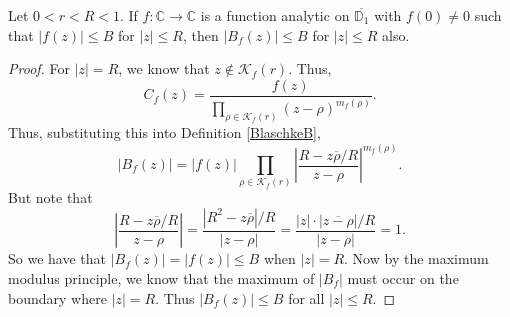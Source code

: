 \begin{lemma}[DiskBound]
\label{DiskBound}
\leanok
Let $0 < r < R<1$. If $f:\mathbb{C}\to\mathbb{C}$ is a function analytic on
    $\overline{\mathbb{D}_1}$ with $f(0)\neq0$ such that $|f(z)|\leq B$ for $|z|\leq R$,
    then $|B_f(z)|\leq B$ for $|z|\leq R$ also.
\end{lemma}
\begin{proof}
\leanok
For $|z|=R$, we know that $z\not\in\mathcal{K}_f(r)$. Thus,
    $$C_f(z)=\frac{f(z)}{\displaystyle\prod_{\rho\in\mathcal{K}_f(r)}(z-\rho)^{m_f(\rho)}}.$$
    Thus, substituting this into Definition \ref{BlaschkeB},
    $$|B_f(z)|=|f(z)|\prod_{\rho\in\mathcal{K}_f(r)}
      \left|\frac{R-z\overline{\rho}/R}{z-\rho}\right|^{m_f(\rho)}.$$
    But note that
    $$\left|\frac{R-z\overline{\rho}/R}{z-\rho}\right|
      =\frac{|R^2-z\overline{\rho}|/R}{|z-\rho|}
      =\frac{|z|\cdot|\overline{z-\rho}|/R}{|z-\rho|}=1.$$
    So we have that $|B_f(z)|=|f(z)|\leq B$ when $|z|=R$. Now by the maximum modulus
    principle, we know that the maximum of $|B_f|$ must occur on the boundary where
    $|z|=R$. Thus $|B_f(z)|\leq B$ for all $|z|\leq R$.
\end{proof}

